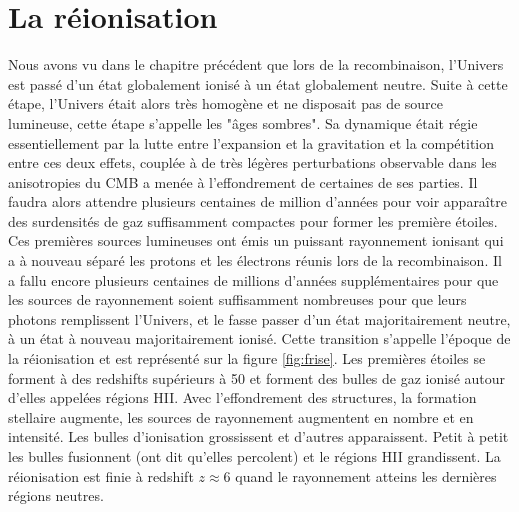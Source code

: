 
\chapter{La réionisation} 
\label{sec:introreio}

%
%
%
%



Nous avons vu dans le chapitre précédent que lors de la recombinaison, l'Univers est passé d'un état globalement ionisé à un état globalement neutre.
Suite à cette étape, l'Univers était alors très homogène et ne disposait pas de source lumineuse, cette étape s'appelle les "âges sombres".
Sa dynamique était régie essentiellement par la lutte entre l'expansion et la gravitation et la compétition entre ces deux effets, couplée à de très légères perturbations observable dans les anisotropies du \ac{CMB} a menée à l'effondrement de certaines de ses parties.
Il faudra alors attendre plusieurs centaines de million d'années pour voir apparaître des surdensités de gaz suffisamment compactes pour former les première étoiles.
Ces premières sources lumineuses ont émis un puissant rayonnement ionisant qui a à nouveau séparé les protons et les électrons réunis lors de la recombinaison.
Il a fallu encore plusieurs centaines de millions d'années supplémentaires pour que les sources de rayonnement soient suffisamment nombreuses pour que leurs photons remplissent l'Univers, et le fasse passer d'un état majoritairement neutre, à un état à nouveau majoritairement ionisé.
Cette transition s'appelle l’époque de la réionisation et est représenté sur la figure \ref{fig:frise}.
Les premières étoiles se forment à des redshifts supérieurs à 50 et forment des bulles de gaz ionisé autour d'elles appelées régions HII.
Avec l’effondrement des structures, la formation stellaire augmente, les sources de rayonnement augmentent en nombre et en intensité.
Les bulles d'ionisation grossissent et d'autres apparaissent.
Petit à petit les bulles fusionnent (ont dit qu'elles percolent) et le régions HII grandissent.
La réionisation est finie à redshift $z\approx 6$ quand le rayonnement atteins les dernières régions neutres.

